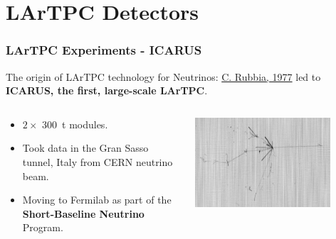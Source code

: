 \section {LArTPC Detectors}


\begin{frame}
  \frametitle{LArTPC Experiments - ICARUS}

  The origin of LArTPC technology for Neutrinos: \href{http://cds.cern.ch/record/117852/files/CERN-EP-INT-77-8.pdf}{C. Rubbia, 1977} led to \textbf{ICARUS, the first, large-scale LArTPC}.

  \begin{columns}
    \begin{column}{0.5\textwidth}
      \begin{itemize}
      \item $2\times$ \SI{300}{\tonne} modules.
      \item Took data in the Gran Sasso tunnel, Italy from CERN
        neutrino beam.
      \item Moving to Fermilab as part of the \textbf{Short-Baseline
        Neutrino} Program.
      \end{itemize}
    \end{column}
    \begin{column}{0.5\textwidth}
      \includegraphics[width=0.8\textwidth]{icarus.png}
    \end{column}
  \end{columns}
\end{frame}

